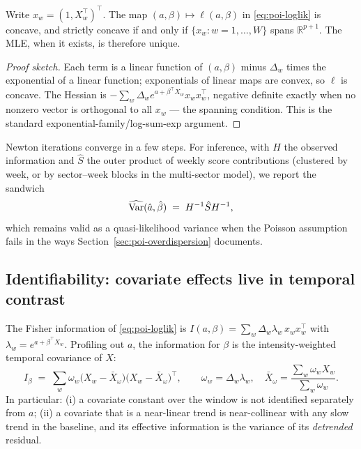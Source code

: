 \begin{proposition}
\label{prop:poi-concave}
Write $x_w = (1, X_w^{\top})^{\top}$. The map $(a,\beta) \mapsto \ell(a,\beta)$ in
\eqref{eq:poi-loglik} is concave, and strictly concave if and only if
$\{x_w : w = 1,\dots,W\}$ spans $\mathbb{R}^{p+1}$. The MLE, when it exists, is therefore
unique.
\end{proposition}

\begin{proof}[Proof sketch]
Each term is a linear function of $(a,\beta)$ minus $\Delta_w$ times the exponential of a
linear function; exponentials of linear maps are convex, so $\ell$ is concave. The Hessian
is $-\sum_w \Delta_w e^{a + \beta^{\top} X_w} x_w x_w^{\top}$, negative definite exactly
when no nonzero vector is orthogonal to all $x_w$ --- the spanning condition. This is the
standard exponential-family/log-sum-exp argument.
\end{proof}

Newton iterations converge in a few steps. For inference, with $H$ the observed
information and $\hat{S}$ the outer product of weekly score contributions (clustered by
week, or by sector--week blocks in the multi-sector model), we report the sandwich
\begin{equation}
\widehat{\mathrm{Var}}(\hat{a}, \hat{\beta}) \;=\; H^{-1} \hat{S} H^{-1},
\label{eq:poi-sandwich}
\end{equation}
which remains valid as a quasi-likelihood variance when the Poisson assumption fails in
the ways Section~\ref{sec:poi-overdispersion} documents.

\subsection{Identifiability: covariate effects live in temporal contrast}
\label{sec:poi-ident}

\begin{proposition}
\label{prop:poi-ident}
The Fisher information of \eqref{eq:poi-loglik} is
$I(a,\beta) = \sum_w \Delta_w \lambda_w\, x_w x_w^{\top}$ with
$\lambda_w = e^{a + \beta^{\top} X_w}$. Profiling out $a$, the information for $\beta$ is
the intensity-weighted temporal covariance of $X$:
\begin{equation}
I_{\beta} \;=\; \sum_w \omega_w \big(X_w - \bar{X}_{\omega}\big)
\big(X_w - \bar{X}_{\omega}\big)^{\top},
\qquad
\omega_w = \Delta_w \lambda_w,\quad
\bar{X}_{\omega} = \frac{\sum_w \omega_w X_w}{\sum_w \omega_w}.
\label{eq:poi-fisher}
\end{equation}
In particular: (i) a covariate constant over the window is not identified separately from
$a$; (ii) a covariate that is a near-linear trend is near-collinear with any slow trend in
the baseline, and its effective information is the variance of its \emph{detrended}
residual.
\end{proposition}

